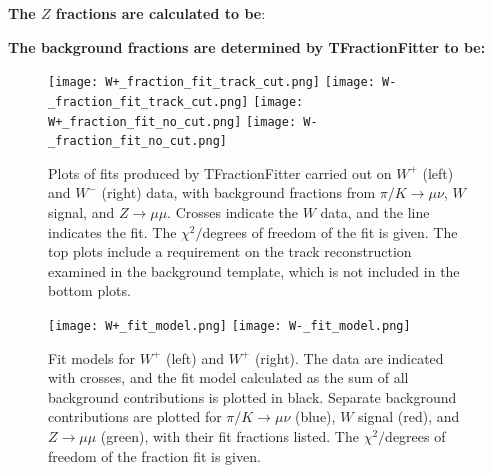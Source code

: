 \documentclass[a4paper]{article}
\begin{document}


\textbf{The $Z$ fractions are calculated to be}: \newline



\textbf{The background fractions are determined by TFractionFitter to be:} \newline

\newline


\begin{figure}[hbt]
\centering
\texttt{[image: W+\_fraction\_fit\_track\_cut.png]}
\texttt{[image: W-\_fraction\_fit\_track\_cut.png]} 
\texttt{[image: W+\_fraction\_fit\_no\_cut.png]}
\texttt{[image: W-\_fraction\_fit\_no\_cut.png]} 
\vspace{-4mm}
\caption{\small Plots of fits produced by TFractionFitter carried out on $W^+$ (left) and $W^-$ (right) data, with background fractions from $\pi/K \xrightarrow{} \mu\nu$, $W$ signal, and $Z \xrightarrow{} \mu\mu$. Crosses indicate the $W$ data, and the line indicates the fit. The $\chi^2/$degrees of freedom of the fit is given. The top plots include a requirement on the track reconstruction examined in the background template, which is not included in the bottom plots.}
\label{fig: W fraction fit}
\end{figure}

\begin{figure}[ht]
\centering
\texttt{[image: W+\_fit\_model.png]}
\texttt{[image: W-\_fit\_model.png]} 
\vspace{-4mm}
\caption{\small Fit models for $W^+$ (left) and $W^+$ (right). The data are indicated with crosses, and the fit model calculated as the sum of all background contributions is plotted in black. Separate background contributions are plotted for $\pi/K \xrightarrow{} \mu\nu$ (blue), $W$ signal (red), and $Z \xrightarrow{} \mu\mu$ (green), with their fit fractions listed. The $\chi^2/$degrees of freedom of the fraction fit is given.}
\label{fig: W fit model}
\end{figure}
\end{document}
